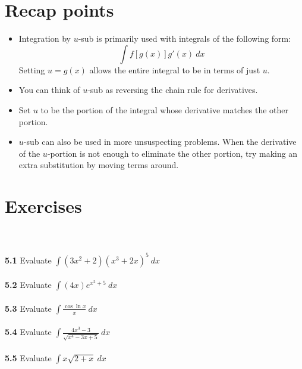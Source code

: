 \documentclass[11pt]{scrartcl}
\begin{document}
\section{Recap points}
\begin{itemize}
    \item Integration by $u$-sub is primarily used with integrals of the following form: 
    $$\int f[g(x)]g'(x) \ dx$$
    \noindent 
    Setting $u=g(x)$ allows the entire integral to be in terms of just $u$. 
    \item You can think of $u$-sub as reversing the chain rule for derivatives. 
    \item Set $u$ to be the portion of the integral whose derivative matches the other portion. 
    \item $u$-sub can also be used in more unsuspecting problems. When the derivative of the $u$-portion is not enough to eliminate the other portion, try making an extra substitution by moving terms around. 
\end{itemize}
\section{Exercises}\\
\\
\noindent 
\textbf{5.1} Evaluate $\int{(3x^2+2)(x^3+2x)^5} \ dx$\\
\\
\noindent 
\textbf{5.2} Evaluate $\int{(4x)e^{x^2+5}} \ dx$\\
\\
\noindent 
\textbf{5.3} Evaluate $\int \frac{\cos{\ln x}}{x} \ dx$\\
\\
\noindent 
\textbf{5.4} Evaluate $\int \frac{4x^3-3}{\sqrt{x^4-3x+5}} \ dx$\\
\\
\noindent 
\textbf{5.5} Evaluate $\int x\sqrt{2+x} \ dx$
\end{document}
